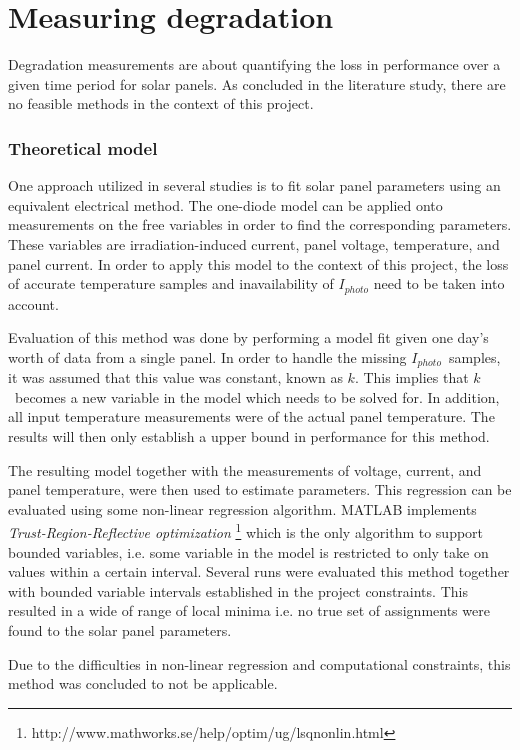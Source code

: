\section{Measuring degradation}
Degradation measurements are about quantifying the loss in performance over a given time period for solar panels.
As concluded in the literature study, there are no feasible methods in the context of this project.

\subsubsection{Theoretical model}
One approach utilized in several studies is to fit solar panel parameters using an equivalent electrical method.
The one-diode model can be applied onto measurements on the free variables in order to find the corresponding parameters.
These variables are irradiation-induced current, panel voltage, temperature, and panel current.
In order to apply this model to the context of this project, the loss of accurate temperature samples and inavailability of
$I_{photo}$ need to be taken into account.

Evaluation of this method was done by performing a model fit given one day's worth of data from a single panel.
In order to handle the missing $I_{photo}$ samples, it was assumed that this value was constant, known as $k$.
This implies that $k$ becomes a new variable in the model which needs to be solved for.
In addition, all input temperature measurements were of the actual panel temperature.
The results will then only establish a upper bound in performance for this method.

The resulting model together with the measurements of voltage, current, and panel temperature, were then used to estimate parameters.
This regression can be evaluated using some non-linear regression algorithm.
MATLAB implements \emph{Trust-Region-Reflective optimization} \footnote{http://www.mathworks.se/help/optim/ug/lsqnonlin.html} which is the only algorithm to support bounded variables, i.e. some variable in the model is restricted to only take on values within a certain interval.
Several runs were evaluated this method together with bounded variable intervals established in the project constraints.
This resulted in a wide of range of local minima i.e. no true set of assignments were found to the solar panel parameters.

Due to the difficulties in non-linear regression and computational constraints, this method was concluded to not be applicable.

